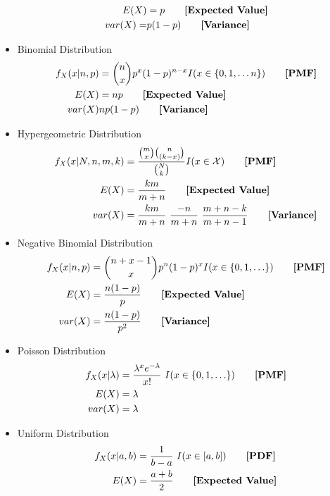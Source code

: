 \documentclass{article}
\begin{document}
\begin{multicols}{2}
\begin{itemize}
\begin{align*}
  	E(X) &=p\tag*{\textbf{[Expected Value]}}\\
  	var(X)=&p(1-p)\tag*{\textbf{[Variance]}}\\
  \end{align*}
  \item Binomial Distribution
  \begin{align*}
  	f_X(x|n,p) &={n \choose x} p^x (1-p)^{n-x} I(x \in \{0,1,\ldots n\})\tag*{\textbf{[PMF]}}\\
  	E(X) &= np \tag*{\textbf{[Expected Value]}}\\
	  var(X) & np(1-p)\tag*{\textbf{[Variance]}}\\
  \end{align*}
  \item Hypergeometric Distribution
  \begin{align*}
  	f_X(x|N,n,m,k) &=\frac{{m \choose x}{n \choose (k-x)}}{{N \choose k}}  I(x \in \mathcal{X})\tag*{\textbf{[PMF]}}\\
  	E(X) &= \frac{km}{m+n}\tag*{\textbf{[Expected Value]}}\\
	  var(X) &= \frac{km}{m+n} ~ \frac{-n}{m+n} ~ \frac{m+n-k}{m+n-1} \tag*{\textbf{[Variance]}}\\
  \end{align*}
  \item Negative Binomial Distribution
  \begin{align*}
  	f_X(x|n,p) &={{n+x-1} \choose {x}} p^n (1-p)^{x} I(x \in \{0,1,\ldots\})\tag*{\textbf{[PMF]}}\\
  	E(X) &= \frac{n(1-p)}{p}   \tag*{\textbf{[Expected Value]}}\\
	  var(X) &= \frac{n(1-p)}{p^2} \tag*{\textbf{[Variance]}}\\
  \end{align*}
  \item Poisson Distribution
  \begin{align*}
  	f_X(x|\lambda ) &= \frac{\lambda^x e^{-\lambda}}{x!}~ I(x \in \{0,1,\ldots\}) \tag*{\textbf{[PMF]}}\\
    E(X) &= \lambda\\
    var(X) &= \lambda\\
  \end{align*}
  \item Uniform Distribution
  \begin{align*}
    f_X(x|a,b) &= \frac{1}{b-a}~ I(x \in [a,b]) \tag*{\textbf{[PDF]}}\\
    E(X) &= \frac{a+b}{2} \tag*{\textbf{[Expected Value]}}\\

\end{align*}
\end{itemize}
\end{multicols}
\end{document}
